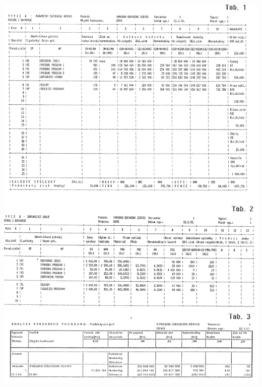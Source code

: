 \documentclass [10pt, fancyhdr, twoside] {article}
\begin{document}
\newpage

\includegraphics[width=\textwidth,height=\textheight,keepaspectratio]{./saturace-tab.png}

\newpage
\end{document}
